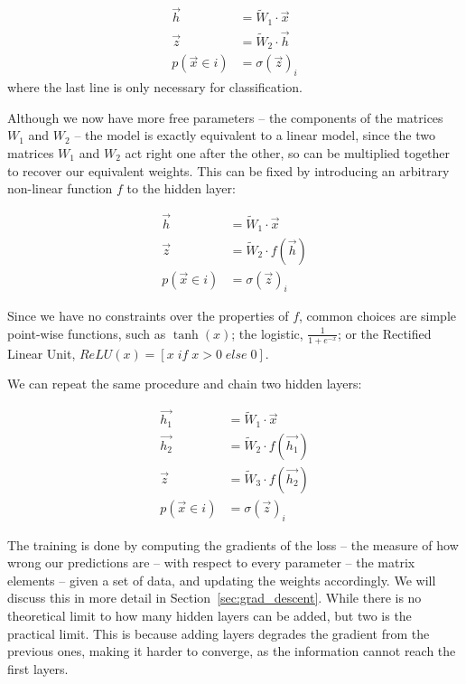 \begin{align*}
\vec{h} &= \widetilde W_1 \cdot \vec{x} \\
\vec{z} &= \widetilde W_2 \cdot \vec{h} \\
p(\vec x \in i) &= \sigma(\vec z)_i
\end{align*}
where the last line is only necessary for classification.

Although we now have more free parameters -- the components of the matrices $W_1$ and $W_2$ -- the model is exactly equivalent to a linear model, since the two matrices $W_1$ and $W_2$ act right one after the other, so can be multiplied together to recover our equivalent weights.
This can be fixed by introducing an arbitrary non-linear function $f$ to the hidden layer:

\begin{align*}
\vec{h} &= \widetilde W_1 \cdot \vec{x} \\
\vec{z} &= \widetilde W_2 \cdot f(\vec{h}) \\
p(\vec x \in i) &= \sigma(\vec z)_i
\end{align*}

Since we have no constraints over the properties of $f$, common choices are simple point-wise functions, such as $\tanh(x)$; the logistic, $\frac{1}{1 + e^{-x}}$; or the Rectified Linear Unit, $ReLU(x)=[x \; if \; x > 0 \; else \; 0]$.

We can repeat the same procedure and chain two hidden layers:

\begin{align*}
\vec{h_1} &= \widetilde W_1 \cdot \vec{x} \\
\vec{h_2} &= \widetilde W_2 \cdot f(\vec{h_1}) \\
\vec{z} &= \widetilde W_3 \cdot f(\vec{h_2}) \\
p(\vec x \in i) &= \sigma(\vec z)_i
\end{align*}

The training is done by computing the gradients of the loss -- the measure of how wrong our predictions are -- with respect to every parameter -- the matrix elements -- given a set of data, and updating the weights accordingly.
We will discuss this in more detail in Section~\ref{sec:grad_descent}.
While there is no theoretical limit to how many hidden layers can be added, but two is the practical limit.
This is because adding layers degrades the gradient from the previous ones, making it harder to converge, as the information cannot reach the first layers.


